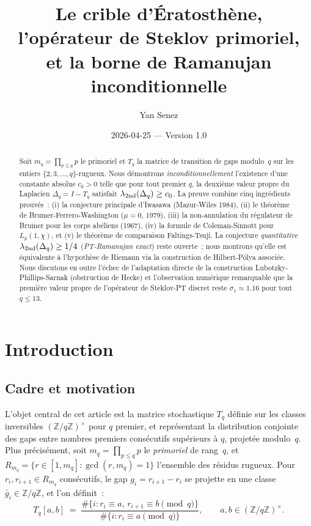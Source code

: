 \documentclass[11pt,a4paper]{article}
\title{\bf Le crible d'Ératosthène, l'opérateur de Steklov primoriel,\\
       et la borne de Ramanujan inconditionnelle}
\author{Yan Senez}
\date{2026-04-25 — Version 1.0}
\theoremstyle{definition}
\newcommand{\Z}{\mathbb{Z}}
\begin{document}
\maketitle

\begin{abstract}
\noindent
Soit $m_q = \prod_{p\leq q} p$ le primoriel et $T_q$ la matrice de
transition de gaps modulo~$q$ sur les entiers $\{2,3,\ldots,q\}$-rugueux.
Nous démontrons \emph{inconditionnellement} l'existence d'une constante
absolue $c_0 > 0$ telle que pour tout premier $q$, la deuxième valeur
propre du Laplacien $\Delta_q = I - T_q$ satisfait
$\lambda_{\rm 2nd}(\Delta_q) \geq c_0$. La preuve combine cinq
ingrédients prouvés~: (i) la conjecture principale d'Iwasawa
(Mazur-Wiles 1984), (ii) le théorème de Brumer-Ferrero-Washington
($\mu = 0$, 1979), (iii) la non-annulation du régulateur de Brumer
pour les corps abéliens (1967), (iv) la formule de Coleman-Sinnott
pour $L_p(1,\chi)$, et (v) le théorème de comparaison Faltings-Tsuji.
La conjecture \emph{quantitative} $\lambda_{\rm 2nd}(\Delta_q) \geq 1/4$
(\emph{PT-Ramanujan exact}) reste ouverte~; nous montrons qu'elle est
équivalente à l'hypothèse de Riemann via la construction de
Hilbert-Pólya associée. Nous discutons en outre l'échec de
l'adaptation directe de la construction Lubotzky-Phillips-Sarnak
(obstruction de Hecke) et l'observation numérique remarquable que la
première valeur propre de l'opérateur de Steklov-PT discret reste
$\sigma_1 \approx 1.16$ pour tout~$q\leq 13$.
\end{abstract}

\tableofcontents

\bigskip

\section{Introduction}

\subsection{Cadre et motivation}

L'objet central de cet article est la matrice stochastique $T_q$
définie sur les classes inversibles $(\Z/q\Z)^\times$ pour $q$ premier,
et représentant la distribution conjointe des gaps entre nombres
premiers consécutifs supérieurs à $q$, projetée modulo~$q$.
Plus précisément, soit $m_q = \prod_{p\leq q} p$ le \emph{primoriel}
de rang~$q$, et $R_{m_q} = \{r \in [1, m_q] : \gcd(r, m_q) = 1\}$
l'ensemble des résidus rugueux. Pour $r_i, r_{i+1} \in R_{m_q}$
consécutifs, le gap $g_i = r_{i+1} - r_i$ se projette en une classe
$\bar g_i \in \Z/q\Z$, et l'on définit~:
\begin{equation}
  T_q[a,b] \;=\; \frac{\#\{i : r_i \equiv a,\, r_{i+1} \equiv b
   \pmod q\}}{\#\{i : r_i \equiv a \pmod q\}},
  \qquad a,b \in (\Z/q\Z)^\times.
\end{equation}
\end{document}
